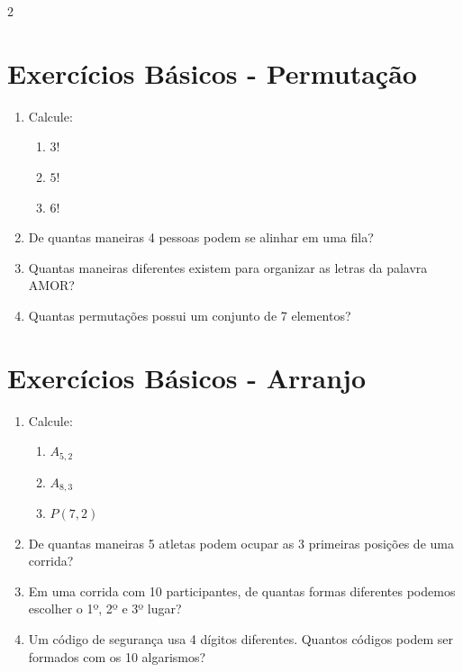 \documentclass[11pt]{article}
\begin{document}
\begin{multicols}{2}
\begin{enumerate}[leftmargin=*]
\end{enumerate}

\section*{Exercícios Básicos - Permutação}

\begin{enumerate}[leftmargin=*, start=5]

\item Calcule:
\begin{enumerate}[label=\alph*)]
\item $3!$
\item $5!$
\item $6!$
\end{enumerate}

\item De quantas maneiras 4 pessoas podem se alinhar em uma fila?

\item Quantas maneiras diferentes existem para organizar as letras da palavra AMOR?

\item Quantas permutações possui um conjunto de 7 elementos?

\end{enumerate}

\section*{Exercícios Básicos - Arranjo}

\begin{enumerate}[leftmargin=*, start=9]

\item Calcule:
\begin{enumerate}[label=\alph*)]
\item $A_{5,2}$
\item $A_{8,3}$
\item $P(7,2)$
\end{enumerate}

\item De quantas maneiras 5 atletas podem ocupar as 3 primeiras posições de uma corrida?

\item Em uma corrida com 10 participantes, de quantas formas diferentes podemos escolher o 1º, 2º e 3º lugar?

\item Um código de segurança usa 4 dígitos diferentes. Quantos códigos podem ser formados com os 10 algarismos?


\end{enumerate}
\end{multicols}
\end{document}
